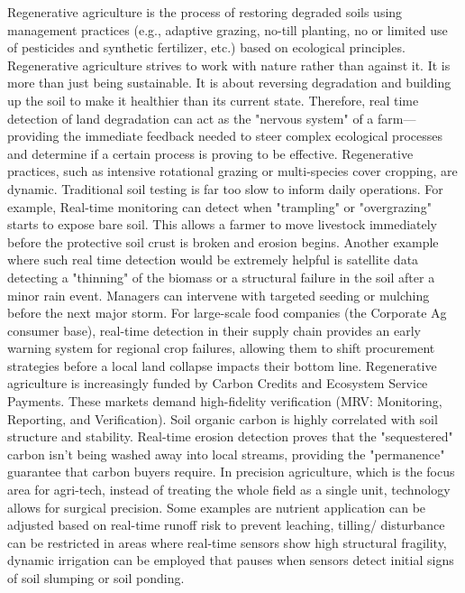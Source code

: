 \documentclass[11pt,letterpaper]{article}
\theoremstyle{plain}
\theoremstyle{definition}
\theoremstyle{remark}
\begin{document}
Regenerative agriculture is the process of restoring degraded soils using management practices (e.g., adaptive grazing, no-till planting, no or limited use of pesticides and synthetic fertilizer, etc.) based on ecological principles. Regenerative agriculture strives to work with nature rather than against it. It is more than just being sustainable. It is about reversing degradation and building up the soil to make it healthier than its current state. Therefore, real time  detection of land degradation can act as the "nervous system" of a farm—providing the immediate feedback needed to steer complex ecological processes and determine if a certain process is proving to be effective. Regenerative practices, such as intensive rotational grazing or multi-species cover cropping, are dynamic. Traditional soil testing is far too slow to inform daily operations. For example, Real-time monitoring can detect when "trampling" or "overgrazing" starts to expose bare soil. This allows a farmer to move livestock immediately before the protective soil crust is broken and erosion begins. Another example where such real time detection would be extremely helpful is satellite data detecting a "thinning" of the biomass or a structural failure in the soil after a minor rain event. Managers can intervene with targeted seeding or mulching before the next major storm. For large-scale food companies (the Corporate Ag consumer base), real-time detection in their supply chain provides an early warning system for regional crop failures, allowing them to shift procurement strategies before a local land collapse impacts their bottom line. Regenerative agriculture is increasingly funded by Carbon Credits and Ecosystem Service Payments. These markets demand high-fidelity verification (MRV: Monitoring, Reporting, and Verification). Soil organic carbon is highly correlated with soil structure and stability. Real-time erosion detection proves that the "sequestered" carbon isn't being washed away into local streams, providing the "permanence" guarantee that carbon buyers require. In precision agriculture, which is the focus area for agri-tech, instead of treating the whole field as a single unit, technology allows for surgical precision. Some examples are nutrient application can be adjusted based on real-time runoff risk to prevent leaching, tilling/ disturbance can be restricted in areas where real-time sensors show high structural fragility, dynamic irrigation can be employed that pauses when sensors detect initial signs of soil slumping or soil ponding.
\end{document}

